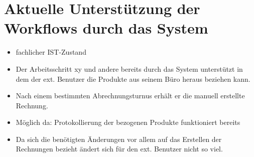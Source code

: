 \section{Aktuelle Unterstützung der Workflows durch das System}
\begin{itemize}
	\item fachlicher IST-Zustand
	\item Der Arbeitsschritt xy und andere bereits durch das System unterstützt in dem der ext. Benutzer die Produkte aus seinem Büro heraus beziehen kann.
	\item Nach einem bestimmten Abrechnungsturnus erhält er die manuell erstellte Rechnung.
	\item Möglich da: Protokollierung der bezogenen Produkte funktioniert bereits
	\item Da sich die benötigten Änderungen vor allem auf das Erstellen der Rechnungen bezieht ändert sich für den ext. Benutzer nicht so viel.
\end{itemize}









